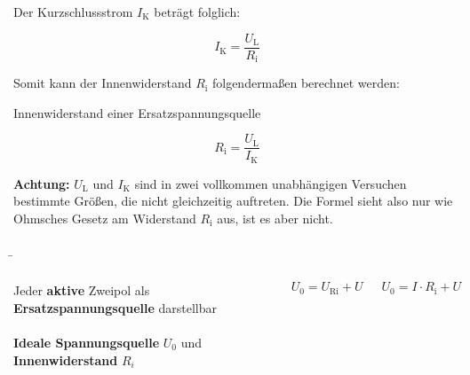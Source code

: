\begin{frame}
{		Der Kurzschlussstrom $I_\mathrm{K}$ beträgt folglich:
		
		
		
		
		\begin{equation*}
			I_\mathrm{K} = \frac{U_\mathrm{L}}{R_\mathrm{i}}
		\end{equation*}
		
		Somit kann der Innenwiderstand $R_\mathrm{i}$ folgendermaßen berechnet werden:
		
		\begin{Merksatz}{Innenwiderstand einer Ersatzspannungsquelle}{}
			
			\begin{equation*}
				R_\mathrm{i} = \frac{U_\mathrm{L}}{I_\mathrm{K}}
			\end{equation*}
			
		\end{Merksatz}
		
		\textbf{Achtung:} $U_\mathrm{L}$ und $I_\mathrm{K}$ sind in zwei vollkommen unabhängigen Versuchen bestimmte Größen, 
		die nicht gleichzeitig auftreten. Die Formel sieht also nur wie Ohmsches Gesetz am Widerstand $R_\mathrm{i}$ aus,
		ist es aber nicht. 
		

		
		
	}
	
	
	
	
	
	\b{
	
		\begin{columns}
			
			
			Jeder \textbf{aktive} Zweipol als \textbf{Ersatzspannungsquelle} darstellbar\\
			
			\phantom{text}\\
			
			\textbf{Ideale Spannungsquelle} $U_0$ und 
			\textbf{Innenwiderstand} $R_i$
			
			\begin{equation*}
				U_0 = U_\mathrm{Ri} + U
			\end{equation*}
			
			\begin{equation*}
				U_0 =I \cdot R_\mathrm{i} + U
			\end{equation*}
			
	

\end{columns}}
\end{frame}
